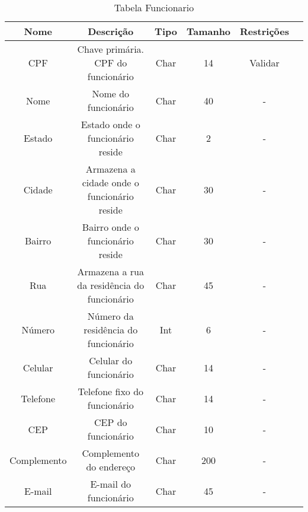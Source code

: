 \begin{table}[htbp]
\caption{Tabela Funcionario}
\begin{center}
\begin{tabular}{|c|c|c|c|c|c|}
\hline
Nome & Descrição & Tipo & Tamanho & Restrições \\ \hline
CPF & Chave primária. CPF do funcionário & Char & 14 & Validar \\ \hline
Nome & Nome do funcionário & Char & 40 & - \\ \hline
Estado & Estado onde o funcionário reside & Char & 2 & - \\ \hline
Cidade & Armazena a cidade onde o funcionário reside & Char & 30 & - \\ \hline
Bairro & Bairro onde o funcionário reside & Char & 30 & - \\ \hline
Rua & Armazena a rua da residência do funcionário & Char & 45 & - \\ \hline
Número & Número da residência do funcionário & Int & 6 & - \\ \hline
Celular & Celular do funcionário & Char & 14 & - \\ \hline
Telefone & Telefone fixo do funcionário & Char & 14 & - \\ \hline
CEP & CEP do funcionário & Char & 10 & - \\ \hline
Complemento & Complemento do endereço & Char & 200 & - \\ \hline
E-mail & E-mail do funcionário & Char & 45 & - \\ \hline
\end{tabular}
\end{center}
\label{tabela_funcionario}
\end{table}
%
%
